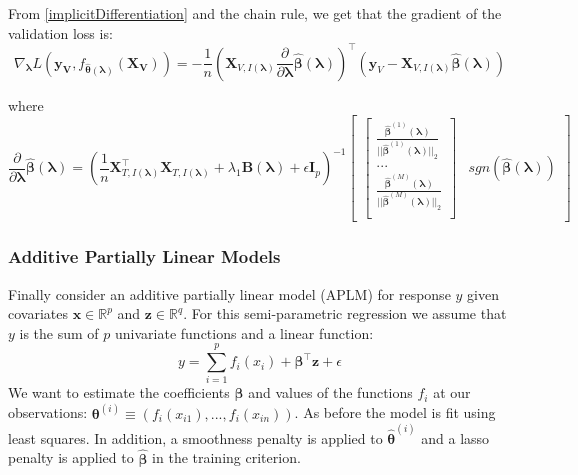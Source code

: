 \documentclass{statsoc}
\begin{document}
From \eqref{implicitDifferentiation} and the chain rule, we get that the gradient of the validation loss is:
\begin{equation}
\nabla_{\boldsymbol \lambda} L(\boldsymbol{y_V}, f_{\hat{\boldsymbol{\theta}}(\boldsymbol{\lambda})}(\boldsymbol{X_V})) =
- \frac{1}{n}
\left (
\boldsymbol{X}_{V, I(\boldsymbol\lambda)}
\frac{\partial}{\partial \boldsymbol\lambda} \hat{\boldsymbol{\beta}}(\boldsymbol{\lambda})
\right )^\top
\left (
\boldsymbol{y}_V - \boldsymbol{X}_{V, I(\boldsymbol\lambda)} \hat{\boldsymbol{\beta}}(\boldsymbol{\lambda})
\right )
\end{equation}

where 
\begin{equation}
\frac{\partial}{\partial \boldsymbol \lambda} \hat{\boldsymbol{\beta}}(\boldsymbol{\lambda})
=
\left (
\frac{1}{n} \boldsymbol{X}_{T, I(\boldsymbol\lambda)}^\top \boldsymbol{X}_{T, I(\boldsymbol\lambda)}
+ \lambda_1 \boldsymbol{B}(\boldsymbol\lambda)
+ \epsilon \boldsymbol I_p
\right ) ^{-1}
\begin{bmatrix}
\begin{bmatrix}
\frac{\hat{\boldsymbol{\beta}}^{(1)}(\boldsymbol \lambda)}{||\hat{\boldsymbol{\beta}}^{(1)} (\boldsymbol \lambda)||_2}\\
...\\
\frac{\hat{\boldsymbol \beta}^{(M)} (\boldsymbol \lambda)}{||\hat{\boldsymbol{\beta}}^{(M)}(\boldsymbol \lambda)||_2}\\
\end{bmatrix}
&
sgn(\hat{\boldsymbol{\beta}}(\boldsymbol{\lambda}))
\end{bmatrix}
\end{equation}

\subsubsection{Additive Partially Linear Models}\label{sec:additive}

Finally consider an additive partially linear model (APLM) for response $y$ given covariates $\boldsymbol{x} \in \mathbb{R}^p$ and $\boldsymbol{z} \in \mathbb{R}^q$. For this semi-parametric regression we assume that $y$ is the sum of $p$ univariate functions and a linear function:
\begin{equation}
y = \sum_{i=1}^p f_i(x_i) + \boldsymbol{\beta}^\top \boldsymbol z  + \epsilon
\end{equation}
We want to estimate the coefficients $\boldsymbol{\beta}$ and values of the functions $f_i$ at our observations: $\boldsymbol{\theta}^{(i)} \equiv (f_i(x_{i1}), ..., f_i(x_{in}))$. As before the model is fit using least squares. In addition, a smoothness penalty is applied to $\hat{\boldsymbol{\theta}}^{(i)}$ and a lasso penalty is applied to $\hat{\boldsymbol{\beta}}$ in the training criterion.
\end{document}
